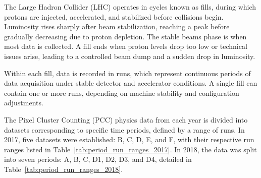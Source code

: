 The Large Hadron Collider (LHC) operates in cycles known as fills, during which protons are injected, accelerated, and stabilized before collisions begin. Luminosity rises sharply after beam stabilization, reaching a peak before gradually decreasing due to proton depletion. The stable beams phase is when most data is collected. A fill ends when proton levels drop too low or technical issues arise, leading to a controlled beam dump and a sudden drop in luminosity.

Within each fill, data is recorded in runs, which represent continuous periods of data acquisition under stable detector and accelerator conditions. A single fill can contain one or more runs, depending on machine stability and configuration adjustments.

The Pixel Cluster Counting (PCC) physics data from each year is divided into datasets corresponding to specific time periods, defined by a range of runs. In 2017, five datasets were established: B, C, D, E, and F, with their respective run ranges listed in Table~\ref{tab:period_run_ranges_2017}. In 2018, the data was split into seven periods: A, B, C, D1, D2, D3, and D4, detailed in Table~\ref{tab:period_run_ranges_2018}.

